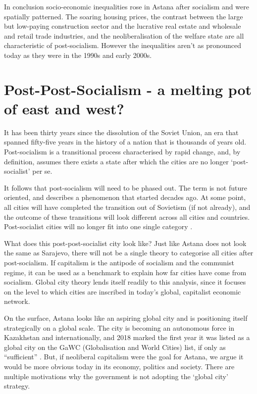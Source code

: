 \documentclass{article}
\begin{document}
In conclusion socio-economic inequalities rose in Astana after socialism and were spatially patterned. The soaring housing prices, the contrast between the large but low-paying construction sector and the lucrative real estate and wholesale and retail trade industries, and the neoliberalisation of the welfare state are all characteristic of post-socialism. However the inequalities aren't as pronounced today as they were in the 1990s and early 2000s.

\section{Post-Post-Socialism - a melting pot of east and west?}


It has been thirty years since the dissolution of the Soviet Union, an era that spanned fifty-five years in the history of a nation that is thousands of years old. Post-socialism is a transitional process characterised by rapid change, and, by definition, assumes there exists a state after which the cities are no longer `post-socialist' per se.  

It follows that post-socialism will need to be phased out. The term is not future oriented, and describes a phenomenon that started decades ago. At some point, all cities will have completed the transition out of Sovietism (if not already), and the outcome of these transitions will look different across all cities and countries. Post-socialist cities will no longer fit into one single category \parencite{hirt2016conceptual}.

What does this post-post-socialist city look like? Just like Astana does not look the same as Sarajevo, there will not be a single theory to categorise all cities after post-socialism. If capitalism is the antipode of socialism and the communist regime, it can be used as a benchmark to explain how far cities have come from socialism. Global city theory lends itself readily to this analysis, since it focuses on the level to which cities are inscribed in today's global, capitalist economic network.

On the surface, Astana looks like an aspiring global city and is positioning itself strategically on a global scale. The city is becoming an autonomous force in Kazakhstan and internationally, and 2018 marked the first year it was listed as a global city on the GaWC (Globalisation and World Cities) list, if only as ``sufficient'' \parencite{gawc2018list}. But, if neoliberal capitalism were the goal for Astana, we argue it would be more obvious today in its economy, politics and society. There are multiple motivations why the government is not adopting the `global city' strategy.
\end{document}
